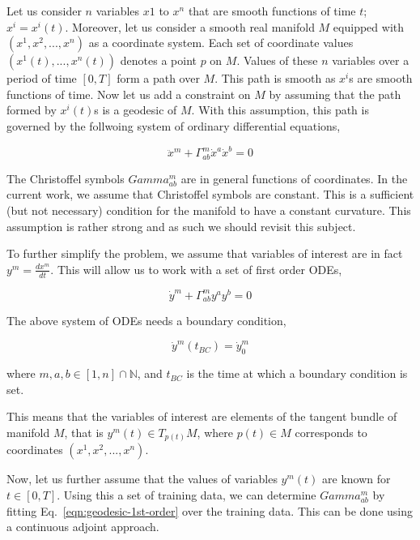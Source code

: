 \documentclass{article}
\begin{document}
Let us consider $n$ variables $x{1}$ to $x^{n}$ that are smooth
functions of time $t$; $x^{i} = x^{i}(t)$. Moreover, let us consider a
smooth real manifold $M$ equipped with $(x^{1},x^{2},...,x^{n})$ as a
coordinate system. Each set of coordinate values
$(x^{1}(t),...,x^{n}(t))$ denotes a point $p$ on $M$. Values of these
$n$ variables over a period of time $[0,T]$ form a path over $M$. This
path is smooth as $x^{i}$s are smooth functions of time. Now let us
add a constraint on $M$ by assuming that the path formed by
$x^{i}(t)$s is a geodesic of $M$. With this assumption, this path is
governed by the follwoing system of ordinary differential equations,

\begin{equation}\label{eqn:geodesic}
\ddot{x}^{m} + \Gamma^{m}_{ab} \dot{x}^{a} \dot{x}^{b} = 0
\end{equation}

The Christoffel symbols $Gamma^{m}_{ab}$ are in general functions of
coordinates. In the current work, we assume that Christoffel symbols
are constant. This is a sufficient (but not necessary) condition for
the manifold to have a constant curvature. This assumption is rather
strong and as such we should revisit this subject.

To further simplify the problem, we assume that variables of interest
are in fact $y^{m} = \frac{dx^{m}}{dt}$. This will allow us to work
with a set of first order ODEs,

\begin{equation}\label{eqn:geodesic-1st-order}
\dot{y}^{m} + \Gamma^{m}_{ab} y^{a} y^{b} = 0
\end{equation}

The above system of ODEs needs a boundary condition,

\begin{equation}\label{eqn:geodesic-bc}
\dot{y}^{m}(t_{BC}) = \dot{y}^{m}_{0}
\end{equation}

where $m,a,b \in [1,n] \cap \mathbb{N}$, and $t_{BC}$ is the time at
which a boundary condition is set.

This means that the variables of interest are elements of the tangent
bundle of manifold $M$, that is $y^{m}(t) \in T_{p(t)}M$, where $p(t)
\in M$ corresponds to coordinates $(x^{1},x^{2},...,x^{n})$.

Now, let us further assume that the values of variables $y^{m}(t)$ are
known for $t \in [0,T]$. Using this a set of training data, we can
determine $Gamma^{m}_{ab}$ by fitting Eq.~\ref{eqn:geodesic-1st-order}
over the training data. This can be done using a continuous adjoint
approach.
\end{document}
